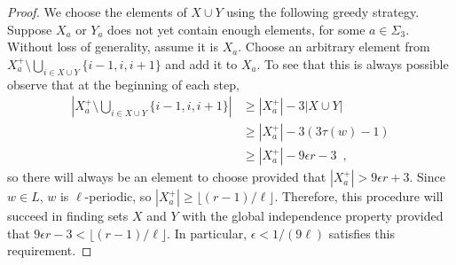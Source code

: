 \documentclass{patmorin}
\begin{document}
\begin{proof}
    We choose the elements of $X\cup Y$ using the following greedy strategy. Suppose $X_a$ or $Y_a$ does not yet contain enough elements, for some $a\in\Sigma_3$. Without loss of generality, assume it is $X_a$.
    Choose an arbitrary element from $X^+_a\setminus\bigcup_{i\in X\cup Y}\{i-1,i,i+1\}$ and add it to $X_a$.  To see that this is always possible observe that at the beginning of each step,
    \begin{align*}
     \left|X^+_a\setminus\bigcup_{i\in X\cup Y}\{i-1,i,i+1\} \right|
     & \ge |X^+_a| - 3|X\cup Y| \\
     & \ge |X^+_a| - 3\left(3\tau(w)-1\right) \\
     & \ge |X^+_a| - 9\epsilon r - 3 \enspace ,
    \end{align*}
    so there will always be an element to choose provided that $|X^+_a|> 9\epsilon r +3$.  Since $w\in L$, $w$ is $\ell$-periodic, so $|X^+_a|\ge \lfloor(r-1)/\ell\rfloor$.  Therefore, this procedure will succeed in finding sets $X$ and $Y$ with the global independence property provided that $9\epsilon r-3 < \lfloor(r-1)/\ell\rfloor$.  In particular, $\epsilon < 1/(9\ell)$ satisfies this requirement.


\end{proof}
\end{document}
